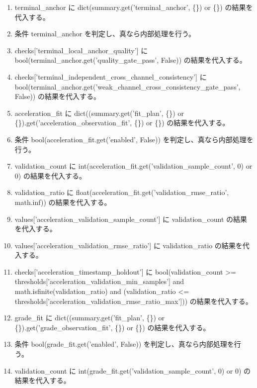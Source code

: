 \documentclass[a4paper,11pt]{article}
\begin{document}
\begin{enumerate}[leftmargin=1.8em]
'end\_to\_end\_terminal\_voltage': math.isfinite(values['end\_to\_end\_terminal\_voltage\_error\_v']) and values['end\_to\_end\_terminal\_voltage\_error\_v'] <= thresholds['end\_to\_end\_terminal\_voltage\_error\_max\_v'], 'terminal\_high\_precision\_evidence': bool(terminal.get('high\_precision\_gate\_pass', False)), 'terminal\_anchor\_role\_operational': terminal\_anchor\_role in \{'independent\_consensus', 'independent\_measurement'\}\} の結果を代入する。
\item terminal\_anchor に dict(summary.get('terminal\_anchor', \{\}) or \{\}) の結果を代入する。
\item 条件 terminal\_anchor を判定し、真なら内部処理を行う。
\item   checks['terminal\_local\_anchor\_quality'] に bool(terminal\_anchor.get('quality\_gate\_pass', False)) の結果を代入する。
\item   checks['terminal\_independent\_cross\_channel\_consistency'] に bool(terminal\_anchor.get('weak\_channel\_cross\_consistency\_gate\_pass', False)) の結果を代入する。
\item acceleration\_fit に dict((summary.get('fit\_plan', \{\}) or \{\}).get('acceleration\_observation\_fit', \{\}) or \{\}) の結果を代入する。
\item 条件 bool(acceleration\_fit.get('enabled', False)) を判定し、真なら内部処理を行う。
\item   validation\_count に int(acceleration\_fit.get('validation\_sample\_count', 0) or 0) の結果を代入する。
\item   validation\_ratio に float(acceleration\_fit.get('validation\_rmse\_ratio', math.inf)) の結果を代入する。
\item   values['acceleration\_validation\_sample\_count'] に validation\_count の結果を代入する。
\item   values['acceleration\_validation\_rmse\_ratio'] に validation\_ratio の結果を代入する。
\item   checks['acceleration\_timestamp\_holdout'] に bool(validation\_count >= thresholds['acceleration\_validation\_min\_samples'] and math.isfinite(validation\_ratio) and (validation\_ratio <= thresholds['acceleration\_validation\_rmse\_ratio\_max'])) の結果を代入する。
\item grade\_fit に dict((summary.get('fit\_plan', \{\}) or \{\}).get('grade\_observation\_fit', \{\}) or \{\}) の結果を代入する。
\item 条件 bool(grade\_fit.get('enabled', False)) を判定し、真なら内部処理を行う。
\item   validation\_count に int(grade\_fit.get('validation\_sample\_count', 0) or 0) の結果を代入する。

\end{enumerate}
\end{document}
